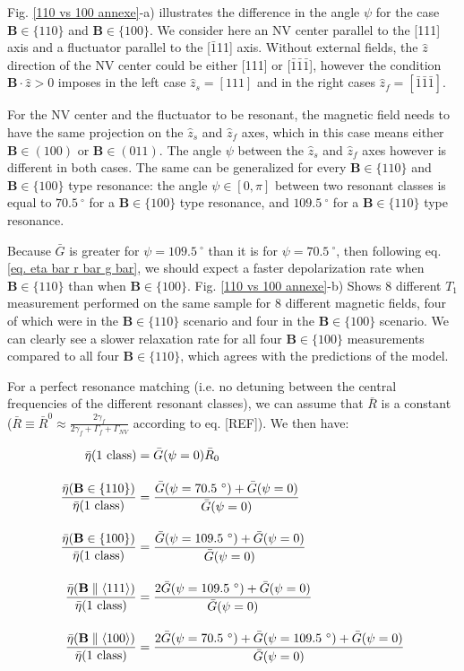 \documentclass[a4paper,11pt]{report}
\begin{document}
Fig. \ref{110 vs 100 annexe}-a) illustrates the difference in the angle $\psi$ for the case $\mathbf{B} \in \{110\}$ and $\mathbf{B} \in \{100\}$. We consider here an NV center parallel to the [111] axis and a fluctuator parallel to the [$\bar 1$11] axis. Without external fields, the $\hat z$ direction of the NV center could be either [111] or [$\bar 1 \bar 1 \bar 1$], however the condition $\mathbf{B}\cdot\hat{z} >0$ imposes in the left case $\hat z_s=[111]$ and in the right cases $\hat z_f=[\bar 1 \bar 1 \bar 1]$. 

For the NV center and the fluctuator to be resonant, the magnetic field needs to have the same projection on the $\hat z_s$ and $\hat z_f$ axes, which in this case means either $\mathbf{B} \in (100)$ or $\mathbf{B} \in (011)$. The angle $\psi$ between the $\hat z_s$ and $\hat z_f$ axes however is different in both cases. The same can be generalized for every $\mathbf{B} \in \{110\}$ and $\mathbf{B} \in \{100\}$ type resonance: the angle $\psi \in [0,\pi]$ between two resonant classes is equal to $70.5 \ ^\circ$ for a $\mathbf{B} \in \{100\}$ type resonance, and $109.5 \ ^\circ$ for a $\mathbf{B} \in \{110\}$ type resonance.

Because $\bar G$ is greater for $\psi=109.5 \ ^\circ$ than it is for $\psi=70.5 \ ^\circ$, then following eq. \ref{eq. eta bar r bar g bar}, we should expect a faster depolarization rate when $\mathbf{B} \in \{110\}$ than when $\mathbf{B} \in \{100\}$. Fig. \ref{110 vs 100 annexe}-b) Shows 8 different $T_1$ measurement performed on the same sample for 8 different magnetic fields, four of which were in the $\mathbf{B} \in \{110\}$ scenario and four in the $\mathbf{B} \in \{100\}$ scenario. We can clearly see a slower relaxation rate for all four $\mathbf{B} \in \{100\}$ measurements compared to all four $\mathbf{B} \in \{110\}$, which agrees with the predictions of the model.

For a perfect resonance matching (i.e. no detuning between the central frequencies of the different resonant classes), we can assume that $\bar R$ is a constant ($\bar R \equiv \bar R^0 \approx \frac{2 \gamma_f}{2 \gamma_f + \Gamma_f + \Gamma_{NV}}$ according to eq. [REF]). We then have:

\begin{align}
\bar \eta(\rm{1\ class})&=\bar G(\psi=0) \bar R_0 \\[1em]
\frac{\bar \eta(\mathbf{B} \in \{110\})}{\bar \eta(\rm{1\ class})}&= \frac{\bar G(\psi=70.5 \ ^\circ)+ \bar G(\psi=0)}{\bar G(\psi=0)}\\[1em]
\frac{\bar \eta(\mathbf{B} \in \{100\})}{\bar \eta(\rm{1\ class})}&= \frac{\bar G(\psi=109.5 \ ^\circ)+ \bar G(\psi=0)}{\bar G(\psi=0)}\\[1em]
\frac{\bar \eta(\mathbf{B} \parallel \langle 111 \rangle)}{\bar \eta(\rm{1\ class})}&= \frac{2\bar G(\psi=109.5 \ ^\circ)+ \bar G(\psi=0)}{\bar G(\psi=0)}\\[1em]
\frac{\bar \eta(\mathbf{B} \parallel \langle 100 \rangle)}{\bar \eta(\rm{1\ class})}&= \frac{2\bar G(\psi=70.5 \ ^\circ)+ \bar G(\psi=109.5 \ ^\circ) + \bar G(\psi=0)}{\bar G(\psi=0)}
\end{align} 
\end{document}
